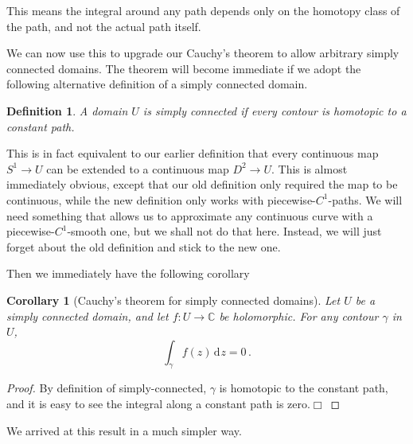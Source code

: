 \documentclass{article}
\theoremstyle{plain}\theoremheaderfont{\normalfont\itshape}\theorembodyfont{\rmfamily}\theoremseparator{.}\newtheorem*{rem}{Remark}\newtheorem*{ex}{Example}\newtheorem*{proof}{Proof}\newtheorem*{altp}{Alternative proof}\newtheorem*{con}{Consequences}\newtheorem*{notn}{Notations}\newtheorem*{cau}{Caution}\newtheorem*{term}{Terminology}\newtheorem*{keyex}{Key example}
\theoremstyle{plain}\theoremheaderfont{\normalfont\bfseries}\theorembodyfont{\rmfamily}\theoremseparator{.}\newtheorem{thm}{Theorem}[section]\newtheorem{lem}[thm]{Lemma}\newtheorem{prop}[thm]{Proposition}\newtheorem*{cor}{Corollary}\newtheorem{defn}[thm]{Definition}\newtheorem{clm}[thm]{Claim}\newtheorem{clminproof}{Claim}\newtheorem{leminproof}{Lemma}\newtheorem{app}{Application}
\theoremstyle{break}\theoremheaderfont{\normalfont\itshape}\theorembodyfont{\rmfamily}\theoremseparator{.\medskip}\newtheorem*{proofskip}{Proof}\newtheorem*{exs}{Examples}\newtheorem*{rems}{Remarks}\newtheorem*{rec}{Recall}\newtheorem*{ppts}{Properties}
\theoremstyle{break}\theoremheaderfont{\normalfont\bfseries}\theorembodyfont{\rmfamily}\theoremseparator{.\medskip}\newtheorem{lemskip}[thm]{Lemma}\newtheorem{defnskip}[thm]{Definition}\newtheorem{propskip}[thm]{Proposition}\newtheorem{thmskip}[thm]{Theorem}
\numberwithin{equation}{section}
\newcommand{\qed}{\hfill\ensuremath{\Box}}
\newcommand{\dd}[2][]{\,\mathrm{d}^{#1} #2}
\newcommand{\CC}{\mathbb{C}}
\begin{document}
    This means the integral around any path depends only on the homotopy class of the path, and not the actual path itself.

    We can now use this to upgrade our Cauchy's theorem to allow arbitrary simply connected domains. The theorem will become immediate if we adopt the following alternative definition of a simply connected domain.

    \begin{defn}
        A domain \(U\) is \textit{simply connected} if every contour is homotopic to a constant path.
    \end{defn}
    This is in fact equivalent to our earlier definition that every continuous map \(S^1\to U\) can be extended to a continuous map \(D^2\to U\). This is almost immediately obvious, except that our old definition only required the map to be continuous, while the new definition only works with piecewise-\(C^1\)-paths. We will need something that allows us to approximate any continuous curve with a piecewise-\(C^1\)-smooth one, but we shall not do that here. Instead, we will just forget about the old definition and stick to the new one.

    Then we immediately have the following corollary
    \begin{cor}[Cauchy's theorem for simply connected domains]
        Let \(U\) be a simply connected domain, and let \(f:U\to\CC\) be holomorphic. For any contour \(\gamma\) in \(U\),
        \[\int_{\gamma}f(z)\dd{z}=0\,.\]
    \end{cor}
    \begin{proof}
        By definition of simply-connected, \(\gamma\) is homotopic to the constant path, and it is easy to see the integral along a constant path is zero.\qed
    \end{proof}
    We arrived at this result in a much simpler way.
\end{document}
